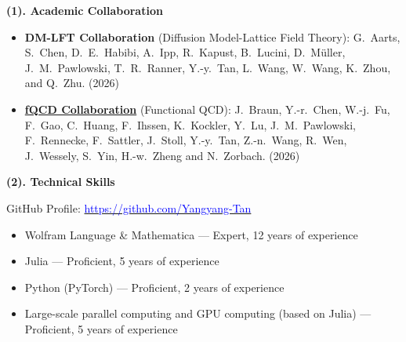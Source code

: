 \documentclass[11pt,a4paper]{article}
\newcommand\dunderline[3][-2pt]{{%
  \sbox0{#3}%
  \ooalign{\copy0\cr\rule[\dimexpr#1-#2\relax]{\wd0}{#2}}}}
\begin{document}
\vspace{1cm}

\dunderline{1.5pt}{\large{\textbf{D. Other Activities}}}
\vspace{0.5cm}

\large{\textbf{(1). Academic Collaboration}}
\normalsize\vspace{1ex}

\begin{itemize}[leftmargin=2em]
\item \textbf{DM-LFT Collaboration} (Diffusion Model-Lattice Field Theory): G.\ Aarts, S.\ Chen, D.\ E.\ Habibi, A.\ Ipp, R.\ Kapust, B.\ Lucini, D.\ M\"uller, J.\ M.\ Pawlowski, T.\ R.\ Ranner, Y.-y.\ Tan, L.\ Wang, W.\ Wang, K.\ Zhou, and Q.\ Zhu. (2026)

\item \href{https://fqcd-collaboration.github.io}{\textbf{fQCD Collaboration}} (Functional QCD): J.\ Braun, Y.-r.\ Chen, W.-j.\ Fu, F.\ Gao, C.\ Huang, F.\ Ihssen, K.\ Kockler, Y.\ Lu, J.\ M.\ Pawlowski, F.\ Rennecke, F.\ Sattler, J.\ Stoll, Y.-y.\ Tan, Z.-n.\ Wang, R.\ Wen, J.\ Wessely, S.\ Yin, H.-w.\ Zheng and N.\ Zorbach. (2026)
\end{itemize}

\vspace{0.4cm}

\large{\textbf{(2). Technical Skills}}
\normalsize\vspace{1ex}

\noindent GitHub Profile: \href{https://github.com/Yangyang-Tan}{\textcolor{blue}{https://github.com/Yangyang-Tan}}

\begin{itemize}[leftmargin=2em]
\item Wolfram Language \& Mathematica --- Expert, 12 years of experience
\item Julia --- Proficient, 5 years of experience
\item Python (PyTorch) --- Proficient, 2 years of experience
\item Large-scale parallel computing and GPU computing (based on Julia) --- Proficient, 5 years of experience
\end{itemize}
\end{document}
